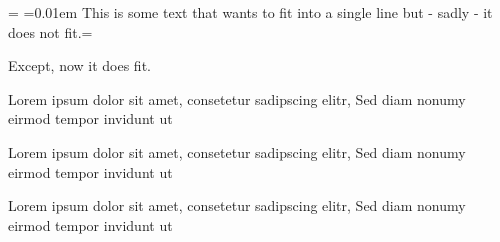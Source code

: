 \newdimen\origiwstr%
\origiwstr=\font%
\font=0.01em This is some text that wants to fit into a single line but - sadly - it does not fit.\font=\origiwstr

\begin{guitar}
	Except, now it does fit.
	
	 
	Lorem ipsum dolor sit amet, consetetur sadipscing elitr, 
	Sed diam nonumy eirmod tempor invidunt ut
	
	 
	Lorem ipsum dolor sit amet, consetetur sadipscing elitr, 
	Sed diam nonumy eirmod tempor invidunt ut
	
	 
	Lorem ipsum dolor sit amet, consetetur sadipscing elitr, 
	Sed diam nonumy eirmod tempor invidunt ut
	
	
	
\end{guitar}